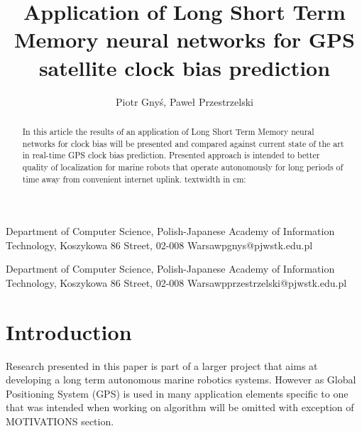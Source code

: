 \documentclass{kybernetika}
\begin{document}
\pagestyle{myheadings}
\title{Application of Long Short Term Memory neural networks for GPS satellite clock 
bias prediction}

\author{Piotr Gny\'{s}, Pawe\l{} Przestrzelski}

{Department of Computer Science,  Polish-Japanese Academy of Information Technology,
Koszykowa 86 Street, 02-008 Warsaw}{pgnys@pjwstk.edu.pl}

{Department of Computer Science,  Polish-Japanese Academy of Information Technology,
Koszykowa 86 Street, 02-008 Warsaw}{pprzestrzelski@pjwstk.edu.pl}


\maketitle

\begin{abstract}
In this article the results of an application of Long Short Term Memory neural networks for
clock bias will be presented and compared against current state of the art in real-time
GPS clock bias prediction. Presented approach is intended to better quality of localization
for marine robots that operate autonomously for long periods of time away from convenient  
internet uplink.
textwidth in cm: \prntlen{\textwidth}
\end{abstract}




\section{Introduction}
Research presented in this paper is part of a larger project that aims at developing a long
term autonomous marine robotics systems. However as Global Positioning System (GPS) is used
in many application elements specific to one that was intended when working on algorithm will
be omitted with exception of MOTIVATIONS section.
\end{document}
